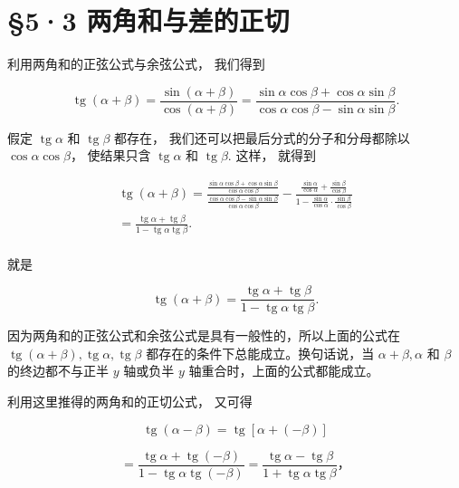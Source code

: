 \section{§5·3 两角和与差的正切}

利用两角和的正弦公式与余弦公式， 我们得到

\[
\operatorname{tg} (\alpha + \beta) = \frac {\sin (\alpha + \beta)}{\cos (\alpha + \beta)} = \frac {\sin \alpha \cos \beta + \cos \alpha \sin \beta}{\cos \alpha \cos \beta - \sin \alpha \sin \beta}.
\]

假定 \(\operatorname{tg} \alpha\) 和 \(\operatorname{tg} \beta\)
都存在， 我们还可以把最后分式的分子和分母都除以
\(\cos \alpha \cos \beta\)， 使结果只含 \(\operatorname{tg} \alpha\) 和
\(\operatorname{tg} \beta\). 这样， 就得到

\[
\begin{array}{l} \operatorname{tg} (\alpha + \beta) = \frac {\frac {\sin \alpha \cos \beta + \cos \alpha \sin \beta}{\cos \alpha \cos \beta}}{\frac {\cos \alpha \cos \beta - \sin \alpha \sin \beta}{\cos \alpha \cos \beta}} - \frac {\frac {\sin \alpha}{\cos \alpha} + \frac {\sin \beta}{\cos \beta}}{1 - \frac {\sin \alpha}{\cos \alpha} \cdot \frac {\sin \beta}{\cos \beta}} \\ = \frac {\operatorname{tg} \alpha + \operatorname{tg} \beta}{1 - \operatorname{tg} \alpha \operatorname{tg} \beta}. \\ \end{array}
\]

就是

\[
\operatorname{tg} (\alpha + \beta) = \frac {\operatorname{tg}\alpha+\operatorname{tg}\beta}{1 - \operatorname{tg}\alpha\operatorname{tg}\beta}.
\]

因为两角和的正弦公式和余弦公式是具有一般性的，所以上面的公式在
\(\operatorname{tg}(\alpha + \beta), \operatorname{tg} \alpha, \operatorname{tg} \beta\)
都存在的条件下总能成立。换句话说，当 \(\alpha + \beta, \alpha\) 和
\(\beta\) 的终边都不与正半 \(y\) 轴或负半 \(y\)
轴重合时，上面的公式都能成立。

利用这里推得的两角和的正切公式， 又可得

\[
\operatorname{tg} (\alpha - \beta) = \operatorname{tg} [ \alpha + (- \beta) ]
\]

\[
= \frac {\operatorname{tg} \alpha + \operatorname{tg} (- \beta)}{1 - \operatorname{tg} \alpha \operatorname{tg} (- \beta)} = \frac {\operatorname{tg} \alpha - \operatorname{tg} \beta}{1 + \operatorname{tg} \alpha \operatorname{tg} \beta}\text{，}
\]

